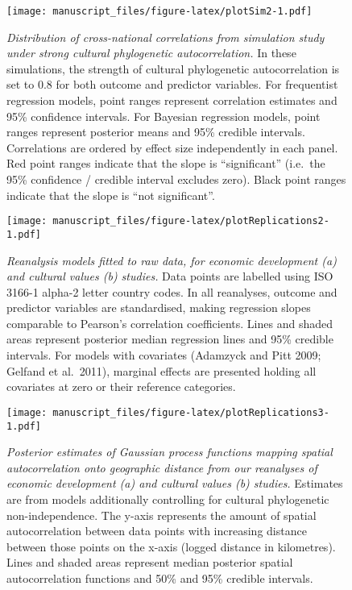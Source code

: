 \documentclass[english,man,floatsintext]{apa6}
\begin{document}
\begin{figure}
\centering
\texttt{[image: manuscript\_files/figure-latex/plotSim2-1.pdf]}
\caption{\label{fig:plotSim2}\emph{Distribution of cross-national correlations from simulation study under strong cultural phylogenetic autocorrelation.} In these simulations, the strength of cultural phylogenetic autocorrelation is set to 0.8 for both outcome and predictor variables. For frequentist regression models, point ranges represent correlation estimates and 95\% confidence intervals. For Bayesian regression models, point ranges represent posterior means and 95\% credible intervals. Correlations are ordered by effect size independently in each panel. Red point ranges indicate that the slope is \enquote{significant} (i.e.~the 95\% confidence / credible interval excludes zero). Black point ranges indicate that the slope is \enquote{not significant}.}
\end{figure}

\newpage



\begin{figure}
\centering
\texttt{[image: manuscript\_files/figure-latex/plotReplications2-1.pdf]}
\caption{\label{fig:plotReplications2}\emph{Reanalysis models fitted to raw data, for economic development (a) and cultural values (b) studies.} Data points are labelled using ISO 3166-1 alpha-2 letter country codes. In all reanalyses, outcome and predictor variables are standardised, making regression slopes comparable to Pearson's correlation coefficients. Lines and shaded areas represent posterior median regression lines and 95\% credible intervals. For models with covariates (Adamzyck and Pitt 2009; Gelfand et al.~2011), marginal effects are presented holding all covariates at zero or their reference categories.}
\end{figure}

\newpage



\begin{figure}
\centering
\texttt{[image: manuscript\_files/figure-latex/plotReplications3-1.pdf]}
\caption{\label{fig:plotReplications3}\emph{Posterior estimates of Gaussian process functions mapping spatial autocorrelation onto geographic distance from our reanalyses of economic development (a) and cultural values (b) studies.} Estimates are from models additionally controlling for cultural phylogenetic non-independence. The y-axis represents the amount of spatial autocorrelation between data points with increasing distance between those points on the x-axis (logged distance in kilometres). Lines and shaded areas represent median posterior spatial autocorrelation functions and 50\% and 95\% credible intervals.}
\end{figure}
\end{document}

